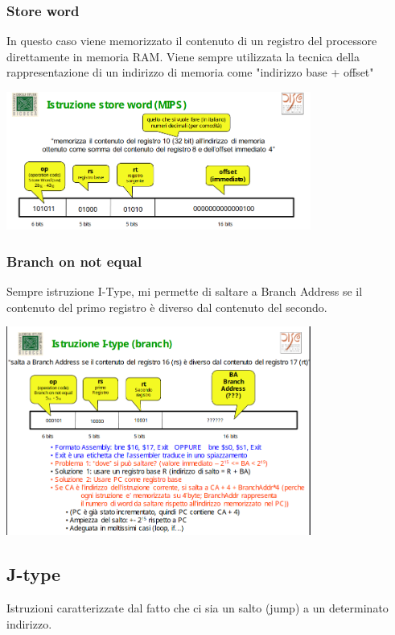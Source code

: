 \documentclass[12pt, a4paper, openany]{book}
\begin{document}
\subsubsection*{Store word}
In questo caso viene memorizzato il contenuto di un registro del processore direttamente
in memoria RAM. Viene sempre utilizzata la tecnica della rappresentazione di un indirizzo di
memoria come "indirizzo base + offset"
\begin{center}
    \includegraphics[width=100mm, scale=0.5]{store word.png}
\end{center}

\subsubsection*{Branch on not equal}
Sempre istruzione I-Type, mi permette di saltare a Branch Address se il contenuto
del primo registro è diverso dal contenuto del secondo.
\begin{center}
    \includegraphics[width=100mm, scale=0.5]{branch.png}
\end{center}


\subsection{J-type}
Istruzioni caratterizzate dal fatto che ci sia un salto (jump) a un determinato
indirizzo.
\end{document}
